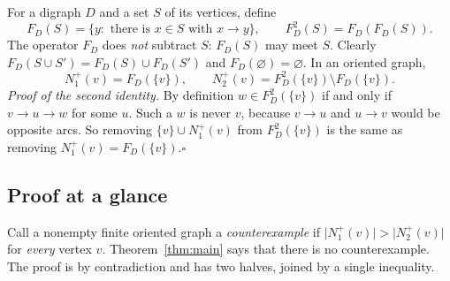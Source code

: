 \documentclass[11pt]{article}
\theoremstyle{remark}
\newcommand{\abs}[1]{\lvert #1\rvert}
\begin{document}
For a digraph \(D\) and a set \(S\) of its vertices, define
\[
 F_D(S)=\{y:\text{ there is }x\in S\text{ with }x\to y\},
 \qquad F_D^2(S)=F_D(F_D(S)).
\]
The operator \(F_D\) does \emph{not} subtract \(S\): $F_D(S)$ may meet $S$.
Clearly $F_D(S\cup S')=F_D(S)\cup F_D(S')$ and $F_D(\varnothing)=\varnothing$.
In an oriented graph,
\begin{equation}\label{eq:exact-second}
 N_1^+(v)=F_D(\{v\}),\qquad N_2^+(v)=F_D^2(\{v\})\setminus F_D(\{v\}).
\end{equation}
\emph{Proof of the second identity.} By definition $w\in F_D^2(\{v\})$ if and
only if $v\to u\to w$ for some $u$. Such a $w$ is never $v$, because
$v\to u$ and $u\to v$ would be opposite arcs. So removing
$\{v\}\cup N_1^+(v)$ from $F_D^2(\{v\})$ is the same as removing
$N_1^+(v)=F_D(\{v\})$.\hfill$\square$

\subsection{Proof at a glance}

Call a nonempty finite oriented graph a \emph{counterexample} if
$\abs{N_1^+(v)}>\abs{N_2^+(v)}$ for \emph{every} vertex $v$.
Theorem~\ref{thm:main} says that there is no counterexample. The proof is by
contradiction and has two halves, joined by a single inequality.
\end{document}
